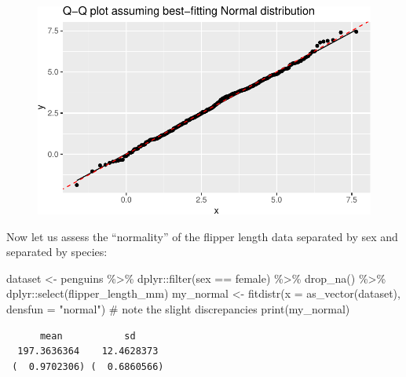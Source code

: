 \documentclass[
  letterpaper,
  DIV=11,
  numbers=noendperiod]{scrreprt}
\newenvironment{Shaded}{\begin{snugshade}}{\end{snugshade}}
\newcommand{\AttributeTok}[1]{\textcolor[rgb]{0.40,0.45,0.13}{#1}}
\newcommand{\CommentTok}[1]{\textcolor[rgb]{0.37,0.37,0.37}{#1}}
\newcommand{\FunctionTok}[1]{\textcolor[rgb]{0.28,0.35,0.67}{#1}}
\newcommand{\NormalTok}[1]{\textcolor[rgb]{0.00,0.23,0.31}{#1}}
\newcommand{\OtherTok}[1]{\textcolor[rgb]{0.00,0.23,0.31}{#1}}
\newcommand{\SpecialCharTok}[1]{\textcolor[rgb]{0.37,0.37,0.37}{#1}}
\newcommand{\StringTok}[1]{\textcolor[rgb]{0.13,0.47,0.30}{#1}}
\begin{document}
\begin{figure}[H]

{\centering \includegraphics{./04-distributions_files/figure-pdf/unnamed-chunk-20-1.pdf}

}

\end{figure}

Now let us assess the ``normality'' of the flipper length data separated
by sex and separated by species:

\begin{Shaded}
\begin{Highlighting}[]
\NormalTok{dataset }\OtherTok{\textless{}{-}}\NormalTok{ penguins }\SpecialCharTok{\%\textgreater{}\%}\NormalTok{  dplyr}\SpecialCharTok{::}\FunctionTok{filter}\NormalTok{(sex }\SpecialCharTok{==} \StringTok{\textquotesingle{}female\textquotesingle{}}\NormalTok{) }\SpecialCharTok{\%\textgreater{}\%} \FunctionTok{drop\_na}\NormalTok{() }\SpecialCharTok{\%\textgreater{}\%}\NormalTok{  dplyr}\SpecialCharTok{::}\FunctionTok{select}\NormalTok{(flipper\_length\_mm) }
\NormalTok{my\_normal }\OtherTok{\textless{}{-}} \FunctionTok{fitdistr}\NormalTok{(}\AttributeTok{x =} \FunctionTok{as\_vector}\NormalTok{(dataset), }\AttributeTok{densfun =} \StringTok{"normal"}\NormalTok{)}
\CommentTok{\# note the slight discrepancies}
\FunctionTok{print}\NormalTok{(my\_normal)}
\end{Highlighting}
\end{Shaded}

\begin{verbatim}
      mean           sd     
  197.3636364    12.4628373 
 (  0.9702306) (  0.6860566)
\end{verbatim}
\end{document}
